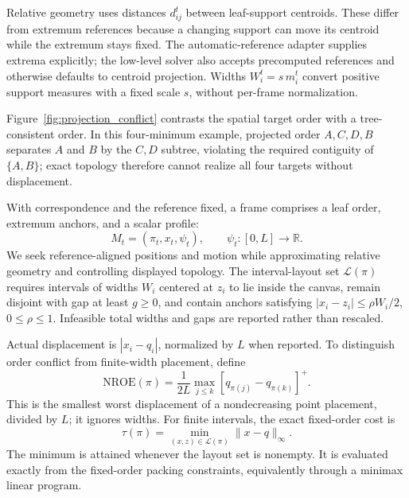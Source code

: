 \documentclass{vgtc}                %
\newcommand{\nroe}{\mathrm{NROE}}
\begin{document}
Relative geometry uses distances $d_{ij}^t$ between leaf-support centroids. These differ from extremum references because a changing support can move its centroid while the extremum stays fixed. The automatic-reference adapter supplies extrema explicitly; the low-level solver also accepts precomputed references and otherwise defaults to centroid projection. Widths $W_i^t=s\,m_i^t$ convert positive support measures with a fixed scale $s$, without per-frame normalization.

Figure~\ref{fig:projection_conflict} contrasts the spatial target order with a tree-consistent order. In this four-minimum example, projected order $A,C,D,B$ separates $A$ and $B$ by the $C,D$ subtree, violating the required contiguity of $\{A,B\}$; exact topology therefore cannot realize all four targets without displacement.



With correspondence and the reference fixed, a frame comprises a leaf order, extremum anchors, and a scalar profile:
\begin{equation}\label{eq:mapframe}
 M_t=(\pi_t,x_t,\psi_t),\qquad\psi_t:[0,L]\to\mathbb{R}.
\end{equation}
We seek reference-aligned positions and motion while approximating relative geometry and controlling displayed topology. The interval-layout set $\mathcal{L}(\pi)$ requires intervals of widths $W_i$ centered at $z_i$ to lie inside the canvas, remain disjoint with gap at least $g\ge0$, and contain anchors satisfying $|x_i-z_i|\le\rho W_i/2$, $0\le\rho\le1$. Infeasible total widths and gaps are reported rather than rescaled.

Actual displacement is $|x_i-q_i|$, normalized by $L$ when reported. To distinguish order conflict from finite-width placement, define
\begin{equation}\label{eq:nroe}
 \nroe(\pi)=\frac{1}{2L}\max_{j\le k}
                      [q_{\pi(j)}-q_{\pi(k)}]^+.
\end{equation}
This is the smallest worst displacement of a nondecreasing point placement, divided by $L$; it ignores widths. For finite intervals, the exact fixed-order cost is
\begin{equation}\label{eq:tau}
 \tau(\pi)=\min_{(x,z)\in\mathcal{L}(\pi)}\|x-q\|_\infty.
\end{equation}
The minimum is attained whenever the layout set is nonempty. It is evaluated exactly from the fixed-order packing constraints, equivalently through a minimax linear program.
\end{document}
